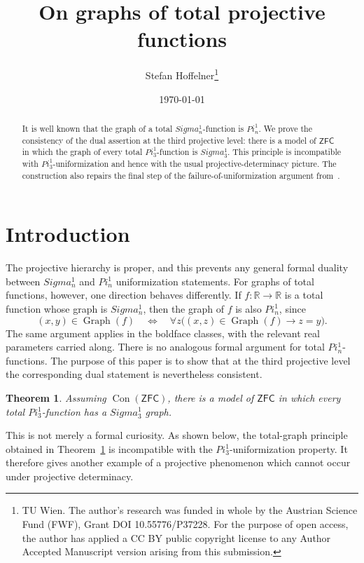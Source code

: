 \documentclass{article}
\title{On graphs of total projective functions}
\author{Stefan Hoffelner\footnote{TU Wien. The author's research was funded in whole by the Austrian Science Fund (FWF), Grant DOI 10.55776/P37228. For the purpose of open access, the author has applied a CC BY public copyright license to any Author Accepted Manuscript version arising from this submission.}}
\date{\today}
\newtheorem{theorem}{Theorem}[section]
\theoremstyle{remark}
\theoremstyle{plain}
\newcommand{\Graph}{\operatorname{Graph}}
\newcommand{\ZFC}{\mathsf{ZFC}}
\newcommand{\Real}{\mathbb{R}}
\def\mathbf#1{#1}%
\def\Pi{Pi}%
\def\Sigma{Sigma}%
\begin{document}
\maketitle

\begin{abstract}
It is well known that the graph of a total $\mathbf{\Sigma}^1_n$-function is
$\mathbf{\Pi}^1_n$. We prove the consistency of the dual assertion at the
third projective level: there is a model of $\ZFC$ in which the graph of every
total $\mathbf{\Pi}^1_3$-function is $\mathbf{\Sigma}^1_3$. This principle is
incompatible with $\mathbf{\Pi}^1_3$-uniformization and hence with the usual
projective-determinacy picture. The construction also repairs the final step
of the failure-of-uniformization argument from~\cite{HOFFELNER2023103292}.
\end{abstract}


\section{Introduction}

The projective hierarchy is proper, and this prevents any general formal
duality between $\mathbf{\Sigma}^1_n$ and $\mathbf{\Pi}^1_n$ uniformization
statements. For graphs of total functions, however, one direction behaves
differently. If $f\colon\Real\to\Real$ is a total function whose graph is
$\mathbf{\Sigma}^1_n$, then the graph of $f$ is also $\mathbf{\Pi}^1_n$, since
\[
 (x,y)\in\Graph(f)
 \quad\Longleftrightarrow\quad
 \forall z\bigl((x,z)\in\Graph(f)\rightarrow z=y\bigr).
\]
The same argument applies in the boldface classes, with the relevant real
parameters carried along. There is no analogous formal argument for total
$\mathbf{\Pi}^1_n$-functions. The purpose of this paper is to show that at the
third projective level the corresponding dual statement is nevertheless
consistent.

\begin{theorem}\label{thm:main}
Assuming $\operatorname{Con}(\ZFC)$, there is a model of $\ZFC$ in which every
total $\mathbf{\Pi}^1_3$-function has a $\mathbf{\Sigma}^1_3$ graph.
\end{theorem}

This is not merely a formal curiosity. As shown below, the total-graph
principle obtained in Theorem~\ref{thm:main} is incompatible with the
$\mathbf{\Pi}^1_3$-uniformization property. It therefore gives another example
of a projective phenomenon which cannot occur under projective determinacy.
\end{document}

